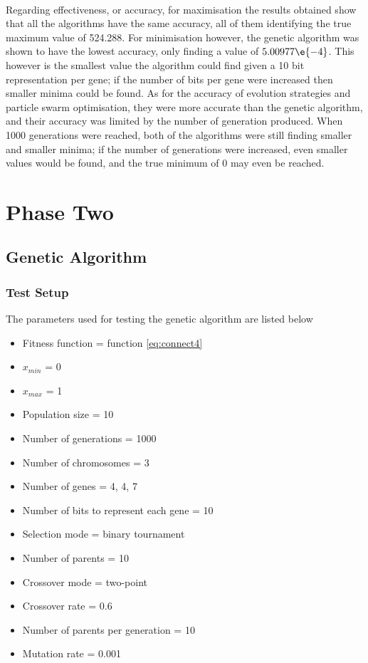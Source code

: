 \\Regarding effectiveness, or accuracy, for maximisation the results obtained show that all the algorithms have the same accuracy, all of them identifying the true maximum value of 524.288. For minimisation however, the genetic algorithm was shown to have the lowest accuracy, only finding a value of $5.00977\e{-4}$. This however is the smallest value the algorithm could find given a 10 bit representation per gene; if the number of bits per gene were increased then smaller minima could be found. As for the accuracy of evolution strategies and particle swarm optimisation, they were more accurate than the genetic algorithm, and their accuracy was limited by the number of generation produced. When 1000 generations were reached, both of the algorithms were still finding smaller and smaller minima; if the number of generations were increased, even smaller values would be found, and the true minimum of 0 may even be reached.

\section{Phase Two}

\subsection{Genetic Algorithm}

\subsubsection{Test Setup}
The parameters used for testing the genetic algorithm are listed below
\begin{itemize}
  \item{Fitness function = function \ref{eq:connect4}}
  \item{$x_{min}$ = 0}
  \item{$x_{max}$ = 1}
  \item{Population size = 10}
  \item{Number of generations = 1000}
  \item{Number of chromosomes = 3}
  \item{Number of genes = 4, 4, 7}
  \item{Number of bits to represent each gene = 10}
  \item{Selection mode = binary tournament}
  \item{Number of parents = 10}
  \item{Crossover mode = two-point}
  \item{Crossover rate = 0.6}
  \item{Number of parents per generation = 10}
  \item{Mutation rate = 0.001}
\end{itemize}

